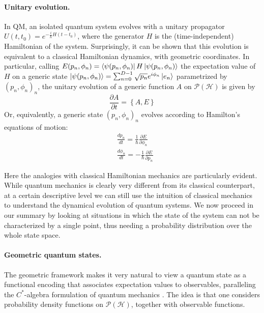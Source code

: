 \documentclass[draft,nofootinbib,pre,twocolumn,showpacs,showkeys,preprintnumbers,floatfix]{revtex4-1}
\newcommand{\1}{\mathbbm{1}}
\newcommand{\PH}{\mathcal{P}(\mathcal{H})}
\begin{document}
\paragraph*{Unitary evolution.} In QM, an isolated quantum system evolves
with a unitary propagator $U(t,t_0) = e^{-\frac{i}{\hbar}H (t-t_0)}$, where the
generator $H$ is the (time-independent) Hamiltonian of the system. Surprisingly, 
it can be shown \cite{Bengtsson2017} that this evolution is equivalent to a classical 
Hamiltonian dynamics, with geometric coordinates. In particular, calling $E(p_n, \phi_n) = \bra{\psi(p_n,\phi_n)}H \ket{\psi(p_n,\phi_n)}$
the expectation value of $H$ on a generic state $\ket{\psi(p_n,\phi_n)} = \sum_{n=0}^{D-1}\sqrt{p_n}e^{i\phi_n}\ket{e_n}$
parametrized by $(p_n,\phi_n)_n$, the unitary evolution of a generic function $A$
on $\PH$ is given by 
\begin{equation}
\frac{\partial A}{\partial t} = \left\{ A,E\right\}
\end{equation}
Or, equivalently, a generic state $(p_n,\phi_n)_n$
evolves according to Hamilton's equations of motion:
\begin{subequations}\label{eq:HAM_EOM}
\begin{align}
&\frac{dp_n}{dt} = \frac{1}{\hbar}\frac{\partial E}{\partial \phi_n} \\
&\frac{d\phi_n}{dt} = -\frac{1}{\hbar}\frac{\partial E}{\partial p_n} 
\end{align}
\end{subequations}

Here the analogies with classical Hamiltonian mechanics are particularly evident.
While quantum mechanics is clearly very different from its classical
counterpart, at a certain descriptive level we can still use the intuition
of classical mechanics to understand the dynamical evolution of quantum systems. 
We now proceed in our summary by looking at situations in which the state of the 
system can not be characterized by a single point, thus needing a probability distribution 
over the whole state space.


\paragraph*{Geometric quantum states.}
The geometric framework makes it very natural to view a quantum state as a functional
encoding that associates expectation values to observables, paralleling the
$C^{*}$-algebra formulation of quantum mechanics \cite{Strocchi2008a}. 
The idea is that one considers probability density functions on $\mathcal{P}(\mathcal{H})$,
together with observable functions. 
\end{document}
